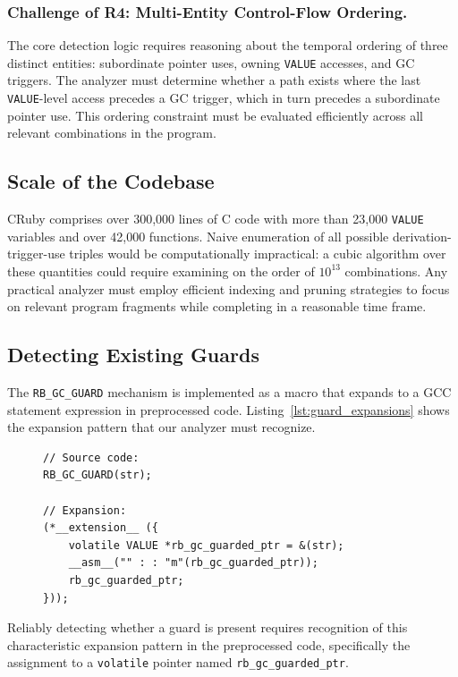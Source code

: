 \subsubsection*{Challenge of R4: Multi-Entity Control-Flow Ordering.}
The core detection logic requires reasoning about the temporal ordering of three distinct entities: subordinate pointer uses, owning \texttt{VALUE} accesses, and GC triggers. The analyzer must determine whether a path exists where the last \texttt{VALUE}-level access precedes a GC trigger, which in turn precedes a subordinate pointer use. This ordering constraint must be evaluated efficiently across all relevant combinations in the program.

\subsection{Scale of the Codebase}

CRuby comprises over 300,000 lines of C code with more than 23,000 \texttt{VALUE} variables and over 42,000 functions. Naive enumeration of all possible derivation-trigger-use triples would be computationally impractical: a cubic algorithm over these quantities could require examining on the order of $10^{13}$ combinations. Any practical analyzer must employ efficient indexing and pruning strategies to focus on relevant program fragments while completing in a reasonable time frame.

\subsection{Detecting Existing Guards}

The \texttt{RB\_GC\_GUARD} mechanism is implemented as a macro that expands to a GCC statement expression in preprocessed code. Listing~\ref{lst:guard_expansions} shows the expansion pattern that our analyzer must recognize.

\begin{figure}[tb]
\begin{lstlisting}[caption={Expansion of \texttt{RB\_GC\_GUARD} with GCC.},label={lst:guard_expansions}]
// Source code:
RB_GC_GUARD(str);

// Expansion:
(*__extension__ ({
    volatile VALUE *rb_gc_guarded_ptr = &(str);
    __asm__("" : : "m"(rb_gc_guarded_ptr));
    rb_gc_guarded_ptr;
}));
\end{lstlisting}
\end{figure}

Reliably detecting whether a guard is present requires recognition of this characteristic expansion pattern in the preprocessed code, specifically the assignment to a \texttt{volatile} pointer named \texttt{rb\_gc\_guarded\_ptr}.
